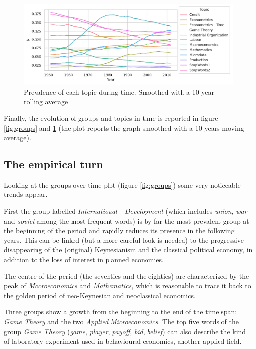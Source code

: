 \documentclass[a4paper, 11pt, headings=standardclasses, tablecaptionsbelow]{scrartcl}
\begin{document}
\begin{figure}[tb]
  \centering
  \includegraphics[width=\textwidth]{src/topics.pdf}
  \caption[Topics]{Prevalence of each topic during time. Smoothed with a 10-year rolling average}
  \label{fig:topics}
\end{figure}

Finally, the evolution of groups and topics in time is reported in figure \ref{fig:groups} and \ref{fig:topics} (the plot reports the graph smoothed with a 10-years moving average).

\subsection{The empirical turn}
Looking at the groups over time plot (figure \ref{fig:groups}) some very noticeable trends appear.

First the group labelled \textit{International - Development} (which includes \textit{union}, \textit{war} and \textit{soviet} among the most frequent words) is by far the most prevalent group at the beginning of the period and rapidly reduces its presence in the following years. This can be linked (but a more careful look is needed) to the progressive disappearing of the (original) Keynesianism and the classical political economy, in addition to the loss of interest in planned economies.

The centre of the period (the seventies and the eighties) are characterized by the peak of \textit{Macroeconomics} and \textit{Mathematics}, which is reasonable to trace it back to the golden period of neo-Keynesian and neoclassical economics.

Three groups show a growth from the beginning to the end of the time span: \textit{Game Theory} and the two \textit{Applied Microeconomics}. The top five words of the group \textit{Game Theory} (\textit{game}, \textit{player}, \textit{payoff}, \textit{bid}, \textit{belief}) can also describe the kind of laboratory experiment used in behavioural economics, another applied field.
\end{document}
